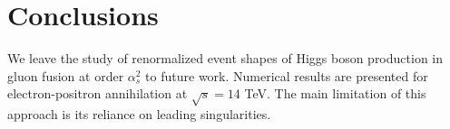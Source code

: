 \section{Conclusions}\label{sec:conclusions}

We leave the study of renormalized event shapes of Higgs boson
production in gluon fusion at order $\alpha_s^2$ to future work.
Numerical results are presented for electron-positron annihilation at
$\sqrt{s} = 14$ TeV. The main limitation of this approach is its
reliance on leading singularities.

